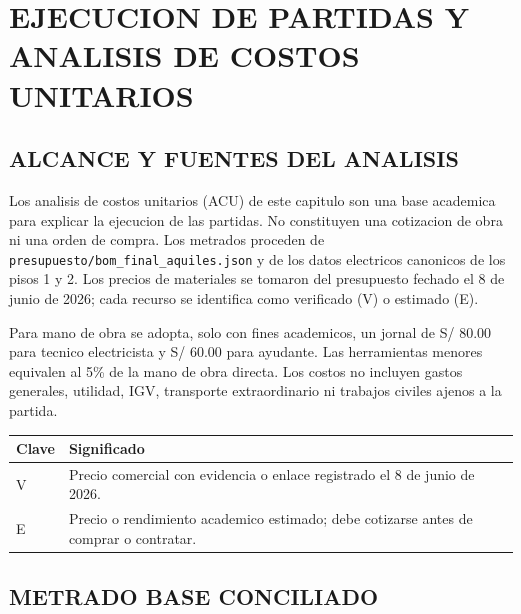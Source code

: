\chapter*{EJECUCION DE PARTIDAS Y ANALISIS DE COSTOS UNITARIOS}

\setcounter{section}{0}
\renewcommand{\thesection}{4.\arabic{section}.}
\renewcommand{\thesubsection}{4.\arabic{section}.\arabic{subsection}.}
\renewcommand{\theHsection}{partidas.\arabic{section}}
\renewcommand{\theHsubsection}{partidas.\arabic{section}.\arabic{subsection}}

\section{ALCANCE Y FUENTES DEL ANALISIS}

Los analisis de costos unitarios (ACU) de este capitulo son una base academica para
explicar la ejecucion de las partidas. No constituyen una cotizacion de obra ni una
orden de compra. Los metrados proceden de
\texttt{presupuesto/bom\_final\_aquiles.json} y de los datos electricos canonicos de
los pisos 1 y 2. Los precios de materiales se tomaron del presupuesto fechado el 8 de
junio de 2026; cada recurso se identifica como verificado (V) o estimado (E).

Para mano de obra se adopta, solo con fines academicos, un jornal de S/ 80.00 para
tecnico electricista y S/ 60.00 para ayudante. Las herramientas menores equivalen al
5\% de la mano de obra directa. Los costos no incluyen gastos generales, utilidad,
IGV, transporte extraordinario ni trabajos civiles ajenos a la partida.

\begin{center}
\small
\begin{tabularx}{\textwidth}{p{} L}
\toprule
\textbf{Clave} & \textbf{Significado} \\
\midrule
V & Precio comercial con evidencia o enlace registrado el 8 de junio de 2026. \\
E & Precio o rendimiento academico estimado; debe cotizarse antes de comprar o contratar. \\
\bottomrule
\end{tabularx}
\end{center}

\section{METRADO BASE CONCILIADO}

